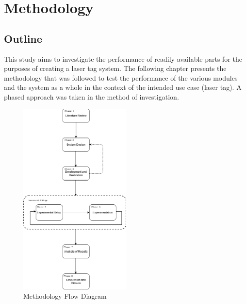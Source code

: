 \chapter{Methodology}
\label{ch_methodology}






\section{Outline}

This study aims to investigate the performance of readily available parts for the purposes of creating a laser tag system. The following chapter presents the methodology that was followed to test the performance of the various modules and the system as a whole in the context of the intended use case (laser tag). A phased approach was taken in the method of investigation.

\begin{figure}[H]
	\centering
	\includegraphics[width=0.5\textwidth]{figures/methodology/methodology}
	\caption{Methodology Flow Diagram}
	\label{fig:methodology_overview}
\end{figure}



